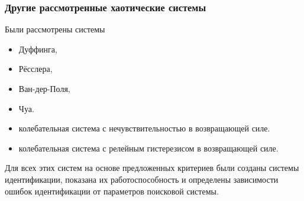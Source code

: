 \documentclass[10pt,utf8]{beamer}
\begin{document}
\begin{frame}
  \frametitle{Другие рассмотренные хаотические системы}

  Были рассмотрены системы
  \begin{itemize}

    \item
      Дуффинга,

    \item
      Рёсслера,

    \item
      Ван-дер-Поля,

    \item
      Чуа.

    \item
    колебательная система с нечувствительностью в возвращающей силе.

    \item
    колебательная система с релейным гистерезисом в возвращающей силе.

  \end{itemize}


  Для всех этих систем на основе предложенных критериев были
  созданы системы идентификации, показана их работоспособность
  и определены зависимости ошибок идентификации от параметров поисковой системы.


\end{frame}




\end{document}
